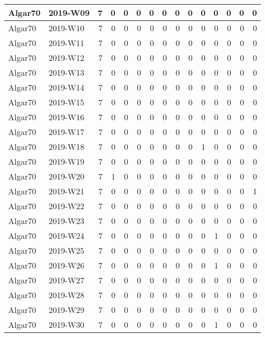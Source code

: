 \documentclass[]{book}
\begin{document}
\begin{table}
\begin{tabular}[t]{l|l|r|r|r|r|r|r|r|r|r|r|r|r|r}
\hline
Algar70 & 2019-W09 & 7 & 0 & 0 & 0 & 0 & 0 & 0 & 0 & 0 & 0 & 0 & 0 & 0\\
\hline
Algar70 & 2019-W10 & 7 & 0 & 0 & 0 & 0 & 0 & 0 & 0 & 0 & 0 & 0 & 0 & 0\\
\hline
Algar70 & 2019-W11 & 7 & 0 & 0 & 0 & 0 & 0 & 0 & 0 & 0 & 0 & 0 & 0 & 0\\
\hline
Algar70 & 2019-W12 & 7 & 0 & 0 & 0 & 0 & 0 & 0 & 0 & 0 & 0 & 0 & 0 & 0\\
\hline
Algar70 & 2019-W13 & 7 & 0 & 0 & 0 & 0 & 0 & 0 & 0 & 0 & 0 & 0 & 0 & 0\\
\hline
Algar70 & 2019-W14 & 7 & 0 & 0 & 0 & 0 & 0 & 0 & 0 & 0 & 0 & 0 & 0 & 0\\
\hline
Algar70 & 2019-W15 & 7 & 0 & 0 & 0 & 0 & 0 & 0 & 0 & 0 & 0 & 0 & 0 & 0\\
\hline
Algar70 & 2019-W16 & 7 & 0 & 0 & 0 & 0 & 0 & 0 & 0 & 0 & 0 & 0 & 0 & 0\\
\hline
Algar70 & 2019-W17 & 7 & 0 & 0 & 0 & 0 & 0 & 0 & 0 & 0 & 0 & 0 & 0 & 0\\
\hline
Algar70 & 2019-W18 & 7 & 0 & 0 & 0 & 0 & 0 & 0 & 0 & 1 & 0 & 0 & 0 & 0\\
\hline
Algar70 & 2019-W19 & 7 & 0 & 0 & 0 & 0 & 0 & 0 & 0 & 0 & 0 & 0 & 0 & 0\\
\hline
Algar70 & 2019-W20 & 7 & 1 & 0 & 0 & 0 & 0 & 0 & 0 & 0 & 0 & 0 & 0 & 0\\
\hline
Algar70 & 2019-W21 & 7 & 0 & 0 & 0 & 0 & 0 & 0 & 0 & 0 & 0 & 0 & 0 & 1\\
\hline
Algar70 & 2019-W22 & 7 & 0 & 0 & 0 & 0 & 0 & 0 & 0 & 0 & 0 & 0 & 0 & 0\\
\hline
Algar70 & 2019-W23 & 7 & 0 & 0 & 0 & 0 & 0 & 0 & 0 & 0 & 0 & 0 & 0 & 0\\
\hline
Algar70 & 2019-W24 & 7 & 0 & 0 & 0 & 0 & 0 & 0 & 0 & 0 & 1 & 0 & 0 & 0\\
\hline
Algar70 & 2019-W25 & 7 & 0 & 0 & 0 & 0 & 0 & 0 & 0 & 0 & 0 & 0 & 0 & 0\\
\hline
Algar70 & 2019-W26 & 7 & 0 & 0 & 0 & 0 & 0 & 0 & 0 & 0 & 1 & 0 & 0 & 0\\
\hline
Algar70 & 2019-W27 & 7 & 0 & 0 & 0 & 0 & 0 & 0 & 0 & 0 & 0 & 0 & 0 & 0\\
\hline
Algar70 & 2019-W28 & 7 & 0 & 0 & 0 & 0 & 0 & 0 & 0 & 0 & 0 & 0 & 0 & 0\\
\hline
Algar70 & 2019-W29 & 7 & 0 & 0 & 0 & 0 & 0 & 0 & 0 & 0 & 0 & 0 & 0 & 0\\
\hline
Algar70 & 2019-W30 & 7 & 0 & 0 & 0 & 0 & 0 & 0 & 0 & 0 & 1 & 0 & 0 & 0\\

\end{tabular}
\end{table}
\end{document}
